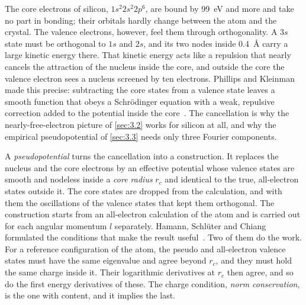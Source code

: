 The core electrons of silicon, $1s^2 2s^2 2p^6$, are bound by \SI{99}{eV} and more and take no part in bonding; their orbitals hardly change between the atom and the crystal. The valence electrons, however, feel them through orthogonality. A $3s$ state must be orthogonal to $1s$ and $2s$, and its two nodes inside \SI{0.4}{\angstrom} carry a large kinetic energy there. That kinetic energy acts like a repulsion that nearly cancels the attraction of the nucleus inside the core, and outside the core the valence electron sees a nucleus screened by ten electrons. Phillips and Kleinman made this precise: subtracting the core states from a valence state leaves a smooth function that obeys a Schr\"odinger equation with a weak, repulsive correction added to the potential inside the core~\cite{phillips1959new}. The cancellation is why the nearly-free-electron picture of \cref{sec:3.2} works for silicon at all, and why the empirical pseudopotential of \cref{sec:3.3} needs only three Fourier components.

A \emph{pseudopotential} turns the cancellation into a construction. It replaces the nucleus and the core electrons by an effective potential whose valence states are smooth and nodeless inside a \emph{core radius} $r_c$ and identical to the true, all-electron states outside it. The core states are dropped from the calculation, and with them the oscillations of the valence states that kept them orthogonal. The construction starts from an all-electron calculation of the atom and is carried out for each angular momentum $l$ separately. Hamann, Schl\"uter and Chiang formulated the conditions that make the result useful~\cite{hamann1979norm}. Two of them do the work. For a reference configuration of the atom, the pseudo and all-electron valence states must have the same eigenvalue and agree beyond $r_c$, and they must hold the same charge inside it. Their logarithmic derivatives at $r_c$ then agree, and so do the first energy derivatives of these. The charge condition, \emph{norm conservation}, is the one with content, and it implies the last.


